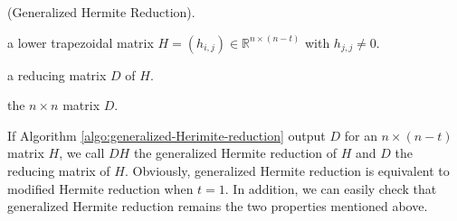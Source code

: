 \documentclass{sig-alternate}
\numberwithin{theorem}{section} \numberwithin{equation}{section}
\begin{document}
\begin{algorithm}[H]
\caption{(Generalized Hermite Reduction).}
\begin{algorithmic}[1]
\REQUIRE a lower trapezoidal matrix $H=(h_{i,j})\in
\mathbb{R}^{n\times (n-t)}$ with $h_{j,j} \neq 0$.

\ENSURE a reducing matrix $D$ of $H$.


\label{algostep:ghr-hermite-reduction-start}
























\label{algostep:generalized-2-hermite-reduction-start}

 \label{algostep:generalized-2-hermite-reduction-end}

\RETURN the $n\times n$ matrix $D$.

\end{algorithmic}\label{algo:generalized-Herimite-reduction}
\end{algorithm}




If Algorithm \ref{algo:generalized-Herimite-reduction} output $D$
for an $n\times (n-t)$ matrix $H$, we call $DH$ the generalized
Hermite reduction of $H$ and $D$ the reducing matrix of $H$.
Obviously, generalized Hermite reduction is equivalent to modified
Hermite reduction when $t=1$. In addition, we can easily check that
generalized Hermite reduction remains the two properties mentioned
above.
\end{document}

